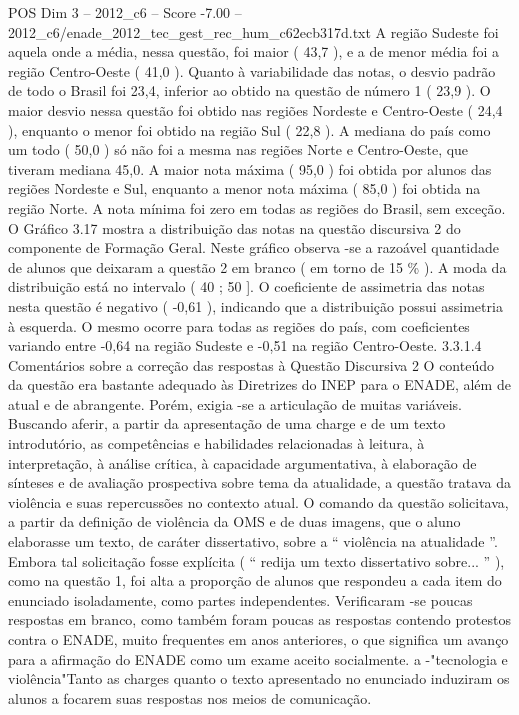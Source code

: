 \begin{textsample}{POS Dim 3 – 2012\_c6 – Score -7.00 – 2012\_c6/enade\_2012\_tec\_gest\_rec\_hum\_c62ecb317d.txt}
A região Sudeste foi aquela onde a média, nessa questão, foi maior ( 43,7 ), e a de menor média foi a região Centro-Oeste ( 41,0 ).
Quanto à variabilidade das notas, o desvio padrão de todo o Brasil foi 23,4, inferior ao obtido na questão de número 1 ( 23,9 ).
O maior desvio nessa questão foi obtido nas regiões Nordeste e Centro-Oeste ( 24,4 ), enquanto o menor foi obtido na região Sul ( 22,8 ).
A mediana do país como um todo ( 50,0 ) só não foi a mesma nas regiões Norte e Centro-Oeste, que tiveram mediana 45,0.
A maior nota máxima ( 95,0 ) foi obtida por alunos das regiões Nordeste e Sul, enquanto a menor nota máxima ( 85,0 ) foi obtida na região Norte.
A nota mínima foi zero em todas as regiões do Brasil, sem exceção.
O Gráfico 3.17 mostra a distribuição das notas na questão discursiva 2 do componente de Formação Geral.
Neste gráfico observa -se a razoável quantidade de alunos que deixaram a questão 2 em branco ( em torno de 15 \% ).
A moda da distribuição está no intervalo ( 40 ; 50 ].
O coeficiente de assimetria das notas nesta questão é negativo ( -0,61 ), indicando que a distribuição possui assimetria à esquerda.
O mesmo ocorre para todas as regiões do país, com coeficientes variando entre -0,64 na região Sudeste e -0,51 na região Centro-Oeste. 3.3.1.4 Comentários sobre a correção das respostas à Questão Discursiva 2 O conteúdo da questão era bastante adequado às Diretrizes do INEP para o ENADE, além de atual e de abrangente.
Porém, exigia -se a articulação de muitas variáveis.
Buscando aferir, a partir da apresentação de uma charge e de um texto introdutório, as competências e habilidades relacionadas à leitura, à interpretação, à análise crítica, à capacidade argumentativa, à elaboração de sínteses e de avaliação prospectiva sobre tema da atualidade, a questão tratava da violência e suas repercussões no contexto atual.
O comando da questão solicitava, a partir da definição de violência da OMS e de duas imagens, que o aluno elaborasse um texto, de caráter dissertativo, sobre a “ violência na atualidade ”.
Embora tal solicitação fosse explícita ( “ redija um texto dissertativo sobre... ” ), como na questão 1, foi alta a proporção de alunos que respondeu a cada item do enunciado isoladamente, como partes independentes.
Verificaram -se poucas respostas em branco, como também foram poucas as respostas contendo protestos contra o ENADE, muito frequentes em anos anteriores, o que significa um avanço para a afirmação do ENADE como um exame aceito socialmente. a -"tecnologia e violência"Tanto as charges quanto o texto apresentado no enunciado induziram os alunos a focarem suas respostas nos meios de comunicação.

\end{textsample}
